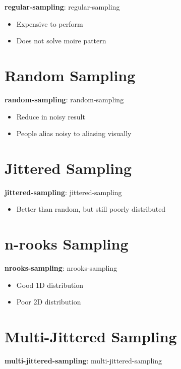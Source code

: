  \textbf{\Gls{regular-sampling}}: \glsdesc{regular-sampling}

  \begin{itemize}
    \item Expensive to perform
    \item Does not solve moire pattern
  \end{itemize}

\section{Random Sampling}

  \textbf{\Gls{random-sampling}}: \glsdesc{random-sampling}

  \begin{itemize}
    \item Reduce in noisy result
    \item People alias noisy to aliasing visually
  \end{itemize}

\section{Jittered Sampling}

  \textbf{\Gls{jittered-sampling}}: \glsdesc{jittered-sampling}

  \begin{itemize}
    \item Better than random, but still poorly distributed
  \end{itemize}

\section{n-rooks Sampling}

  \textbf{\Gls{nrooks-sampling}}: \glsdesc{nrooks-sampling}

  \begin{itemize}
    \item Good 1D distribution
    \item Poor 2D distribution
  \end{itemize}

\section{Multi-Jittered Sampling}

  \textbf{\Gls{multi-jittered-sampling}}: \glsdesc{multi-jittered-sampling}

